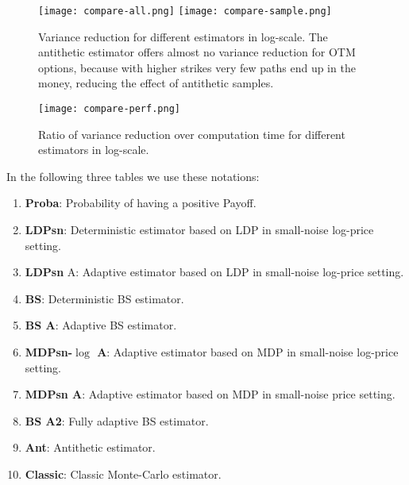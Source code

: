 \documentclass{amsart}[11pt]
\numberwithin{equation}{section}
\numberwithin{theorem}{subsection}
\numberwithin{proposition}{subsection}
\numberwithin{definition}{subsection}
\numberwithin{lemma}{subsection}
\numberwithin{assumption}{subsection}
\begin{document}
\begin{figure}[hbt!]
    \centering
    \texttt{[image: compare-all.png]}
    \texttt{[image: compare-sample.png]}
    \caption{Variance reduction for different estimators in log-scale. 
    The antithetic estimator offers almost no variance reduction for OTM options, 
    because with higher strikes very few paths end up in the money, reducing the effect of antithetic samples.} \label{ref:OverallVarRedu}
\end{figure}

\begin{figure}
    \centering
    \texttt{[image: compare-perf.png]}
    \caption{Ratio of variance reduction over computation time for different estimators in log-scale.}\label{ref:OverallVarComp}
\end{figure}
\noindent In the following three tables we use these notations:
\begin{enumerate}[-]
    \item \textbf{Proba}: Probability of having a positive Payoff.
    \item \textbf{LDPsn}: Deterministic estimator based on LDP in small-noise log-price setting.
    \item \textbf{LDPsn} A: Adaptive estimator based on LDP in small-noise log-price setting.
    \item \textbf{BS}: Deterministic BS estimator.
    \item \textbf{BS A}: Adaptive BS estimator.
    \item \textbf{MDPsn-${\log}$ A}: Adaptive estimator based on MDP in small-noise log-price setting.
    \item \textbf{MDPsn A}: Adaptive estimator based on MDP in small-noise price setting.
    \item \textbf{BS A2}: Fully adaptive BS estimator.
    \item \textbf{Ant}: Antithetic estimator.
    \item \textbf{Classic}: Classic Monte-Carlo estimator.
\end{enumerate}
\end{document}
